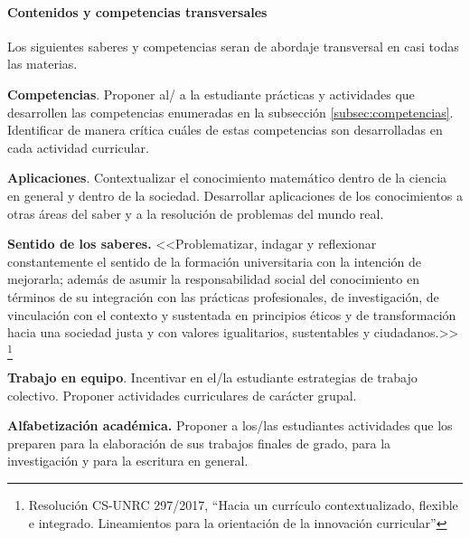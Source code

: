 \documentclass[a4paper, 12pt]{article}
\begin{document}
\paragraph{Contenidos y competencias transversales}

Los siguientes  saberes y competencias seran de abordaje transversal en casi todas las materias. 


\begin{description}
  



\item{\textbf{Competencias}.} Proponer al/ a la estudiante prácticas y actividades que desarrollen las competencias enumeradas en la subsección \ref{subsec:competencias}. Identificar de manera crítica cuáles de estas competencias son desarrolladas en cada actividad curricular.


\item{\textbf{Aplicaciones}.}  Contextualizar el conocimiento matemático dentro de la ciencia en general y dentro de la sociedad. Desarrollar aplicaciones de los conocimientos a otras áreas del saber y a la resolución de problemas del mundo real. 




\item{ \textbf{Sentido de los saberes.}} <<Problematizar, indagar y reflexionar constantemente el sentido de la formación
universitaria con la intención de mejorarla; además de asumir la responsabilidad social del
conocimiento en términos de su integración con las prácticas profesionales, de investigación, de
vinculación con el contexto y sustentada en principios éticos y de transformación hacia una
sociedad justa y con valores igualitarios, sustentables y ciudadanos.>> \footnote{Resolución CS-UNRC 297/2017, ``Hacia   un   currículo contextualizado, flexible e integrado. Lineamientos para la orientación de la innovación  curricular''}

\item{\textbf{Trabajo en equipo}.} Incentivar en el/la estudiante estrategias de trabajo colectivo. Proponer actividades curriculares   de carácter  grupal.



\item{ \textbf{Alfabetización académica.}} Proponer a los/las estudiantes actividades que los preparen para la
elaboración de sus trabajos finales de grado, para la investigación y para la escritura en general. 





\end{description}
\end{document}
